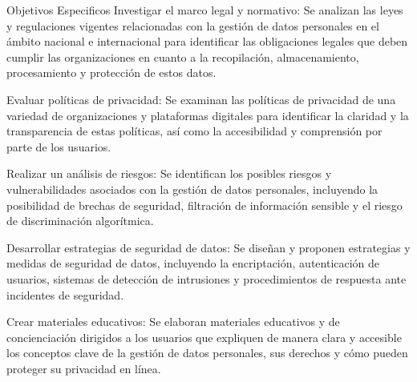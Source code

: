 Objetivos Especificos
Investigar el marco legal y normativo: Se analizan las leyes y regulaciones vigentes relacionadas con la gestión de datos personales en el ámbito nacional e internacional para identificar las obligaciones legales que deben cumplir las organizaciones en cuanto a la recopilación, almacenamiento, procesamiento y protección de estos datos.

Evaluar políticas de privacidad: Se examinan las políticas de privacidad de una variedad de organizaciones y plataformas digitales para identificar la claridad y la transparencia de estas políticas, así como la accesibilidad y comprensión por parte de los usuarios.

Realizar un análisis de riesgos: Se identifican los posibles riesgos y vulnerabilidades asociados con la gestión de datos personales, incluyendo la posibilidad de brechas de seguridad, filtración de información sensible y el riesgo de discriminación algorítmica.

Desarrollar estrategias de seguridad de datos: Se diseñan y proponen estrategias y medidas de seguridad de datos, incluyendo la encriptación, autenticación de usuarios, sistemas de detección de intrusiones y procedimientos de respuesta ante incidentes de seguridad.

Crear materiales educativos: Se elaboran materiales educativos y de concienciación dirigidos a los usuarios que expliquen de manera clara y accesible los conceptos clave de la gestión de datos personales, sus derechos y cómo pueden proteger su privacidad en línea.



